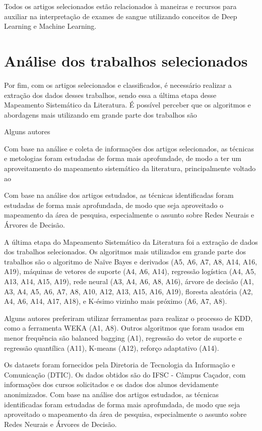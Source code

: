 Todos os artigos selecionados estão relacionados à maneiras e recursos para auxiliar na interpretação de exames de sangue utilizando conceitos de Deep Learning e Machine Learning.

\section{Análise dos trabalhos selecionados}

Por fim, com os artigos selecionados e classificados, é necessário realizar a extração dos dados desses trabalhos, sendo essa a última etapa desse Mapeamento Sistemático da Literatura. É possível perceber que os algoritmos e abordagens mais utilizando em grande parte dos trabalhos são

Alguns autores

Com base na análise e coleta de informações dos artigos selecionados, as técnicas e metologias foram estudadas de forma mais aprofundade, de modo a ter um aproveitamento do mapeamento sistemático da literatura, principalmente voltado ao

Com base na análise dos artigos estudados, as técnicas identificadas
foram estudadas de forma mais aprofundada, de modo que seja aproveitado o mapeamento da área de
pesquisa, especialmente o assunto sobre Redes Neurais e Árvores de Decisão.

A última etapa do Mapeamento Sistemático da Literatura foi a extração de dados dos trabalhos
selecionados. Os algoritmos mais utilizados em grande parte dos trabalhos são o algoritmo de Naïve Bayes
e derivados (A5, A6, A7, A8, A14, A16, A19), máquinas de vetores de suporte (A4, A6, A14), regressão
logística (A4, A5, A13, A14, A15, A19), rede neural (A3, A4, A6, A8, A16), árvore de decisão (A1, A3,
A4, A5, A6, A7, A8, A10, A12, A13, A15, A16, A19), floresta aleatória (A2, A4, A6, A14, A17, A18), e
K-ésimo vizinho mais próximo (A6, A7, A8).

Alguns autores preferiram utilizar ferramentas para realizar o processo de KDD, como a ferramenta
WEKA (A1, A8). Outros algoritmos que foram usados em menor frequência são balanced bagging (A1),
regressão do vetor de suporte e regressão quantílica (A11), K-means (A12), reforço adaptativo (A14).

Os datasets foram fornecidos pela Diretoria de Tecnologia da Informação e Comunicação (DTIC).
Os dados obtidos são do IFSC - Câmpus Caçador, com informações dos cursos solicitados e os dados dos
alunos devidamente anonimizados. Com base na análise dos artigos estudados, as técnicas identificadas
foram estudadas de forma mais aprofundada, de modo que seja aproveitado o mapeamento da área de
pesquisa, especialmente o assunto sobre Redes Neurais e Árvores de Decisão.

